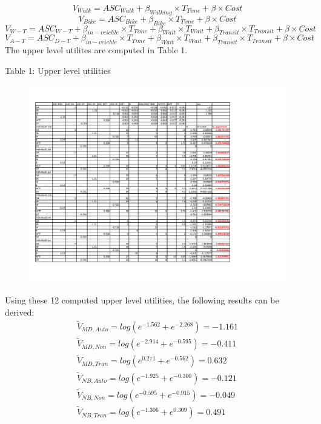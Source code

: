 \documentclass[11pt]{article}
\begin{document}
\begin{equation}
V_{Walk}=ASC_{Walk}+\beta_{Walking}\times T_{Time}+\beta\times Cost
\end{equation}		
\begin{equation}
V_{Bike}=ASC_{Bike}+\beta_{Bike}\times T_{Time}+\beta\times Cost
\end{equation}	
\begin{equation}
V_{W-T}=ASC_{W-T}+\beta_{in-veichle}\times T_{Time}+\beta_{Wait}\times T_{Wait}+\beta_{Transit}\times T_{Transit}+\beta\times Cost
\end{equation}		
\begin{equation}
V_{A-T}=ASC_{D-T}+\beta_{in-veichle}\times T_{Time}+\beta_{Wait}\times T_{Wait}+\beta_{Transit}\times T_{Transit}+\beta\times Cost
\end{equation}	
The upper level utilites are computed in Table 1.
\begin{center}
Table 1: Upper level utilities
\end{center}
\begin{figure}[H]
\centering
\vspace{-0.6cm}    
\includegraphics[width=\linewidth]{tb1.pdf}  
\end{figure}
Using these 12 computed upper level utilities, the following results can be derived:
\begin{align}
\tilde{V}_{MD,Auto}=log(e^{-1.562}+e^{-2.268})=-1.161\\
\tilde{V}_{MD,Non}=log(e^{-2.914}+e^{-0.595})=-0.411\\
\tilde{V}_{MD,Tran}=log(e^{0.271}+e^{-0.562})=0.632\\
\tilde{V}_{NB,Auto}=log(e^{-1.925}+e^{-0.300})=-0.121\\
\tilde{V}_{NB,Non}=log(e^{-0.595}+e^{-0.915})=-0.049\\
\tilde{V}_{NB,Tran}=log(e^{-1.306}+e^{0.309})=0.491
\end{align}
\end{document}
